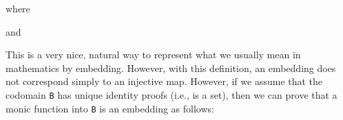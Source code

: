 \begin{Shaded}
\begin{Highlighting}[]
\OtherTok{:} \OtherTok{\{}\OtherTok{:}\OtherTok{\}} \OtherTok{\{}\OtherTok{:}\OtherTok{\}}  \OtherTok{(}\OtherTok{)} 
\OtherTok{=} \OtherTok{(}\OtherTok{:}\OtherTok{)} \OtherTok{(}\OtherTok{)}
\end{Highlighting}
\end{Shaded}

where

\begin{Shaded}
\begin{Highlighting}[]
\OtherTok{:}
\OtherTok{=} \OtherTok{(}\OtherTok{:}\OtherTok{)} 
\end{Highlighting}
\end{Shaded}

and

\begin{Shaded}
\begin{Highlighting}[]
\OtherTok{:} \OtherTok{\{}\OtherTok{:}\OtherTok{\}} \OtherTok{\{}\OtherTok{:}\OtherTok{\}} \OtherTok{(}\OtherTok{:}\OtherTok{)} 
\OtherTok{=}
\end{Highlighting}
\end{Shaded}

This is a very nice, natural way to represent what we usually mean in
mathematics by embedding. However, with this definition, an embedding
does not correspond simply to an injective map. However, if we assume
that the codomain \texttt{B} has unique identity proofs (i.e., is a
set), then we can prove that a monic function into \texttt{B} is an
embedding as follows:

